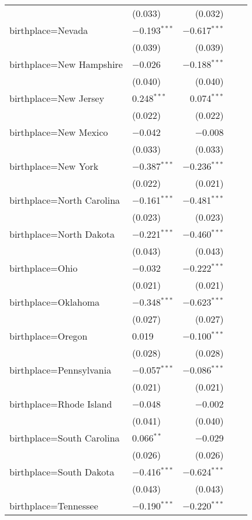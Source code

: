 \begin{longtable}{ll|rrr}
        & (0.033) & (0.032) \\ 
        birthplace=Nevada & $-$0.193$^{***}$ & $-$0.617$^{***}$ \\ 
        & (0.039) & (0.039) \\ 
        birthplace=New Hampshire & $-$0.026 & $-$0.188$^{***}$ \\ 
        & (0.040) & (0.040) \\ 
        birthplace=New Jersey & 0.248$^{***}$ & 0.074$^{***}$ \\ 
        & (0.022) & (0.022) \\ 
        birthplace=New Mexico & $-$0.042 & $-$0.008 \\ 
        & (0.033) & (0.033) \\ 
        birthplace=New York & $-$0.387$^{***}$ & $-$0.236$^{***}$ \\ 
        & (0.022) & (0.021) \\ 
        birthplace=North Carolina & $-$0.161$^{***}$ & $-$0.481$^{***}$ \\ 
        & (0.023) & (0.023) \\ 
        birthplace=North Dakota & $-$0.221$^{***}$ & $-$0.460$^{***}$ \\ 
        & (0.043) & (0.043) \\ 
        birthplace=Ohio & $-$0.032 & $-$0.222$^{***}$ \\ 
        & (0.021) & (0.021) \\ 
        birthplace=Oklahoma & $-$0.348$^{***}$ & $-$0.623$^{***}$ \\ 
        & (0.027) & (0.027) \\ 
        birthplace=Oregon & 0.019 & $-$0.100$^{***}$ \\ 
        & (0.028) & (0.028) \\ 
        birthplace=Pennsylvania & $-$0.057$^{***}$ & $-$0.086$^{***}$ \\ 
        & (0.021) & (0.021) \\ 
        birthplace=Rhode Island & $-$0.048 & $-$0.002 \\ 
        & (0.041) & (0.040) \\ 
        birthplace=South Carolina & 0.066$^{**}$ & $-$0.029 \\ 
        & (0.026) & (0.026) \\ 
        birthplace=South Dakota & $-$0.416$^{***}$ & $-$0.624$^{***}$ \\ 
        & (0.043) & (0.043) \\ 
        birthplace=Tennessee & $-$0.190$^{***}$ & $-$0.220$^{***}$ \\ 

\end{longtable}
